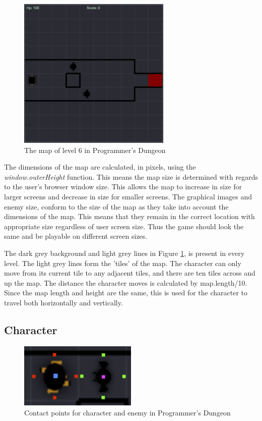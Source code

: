 \documentclass[a4paper,11.5pt]{report}
\numberwithin{figure}{section}
\numberwithin{table}{section}
\numberwithin{equation}{section}
\numberwithin{equation}{section}
\begin{document}
\begin{figure}[H]
 \centering
    \includegraphics[width=0.65\textwidth]{levelsix}
       \captionsetup{justification=centering}
\caption{The map of level 6 in Programmer's Dungeon}
\label{fig:levelsix}
\end{figure}


The dimensions of the map are calculated, in pixels, using the \textit{window.outerHeight} function. This means the map size is determined with regards to the user's browser window size. This allows the map to increase in size for larger screens and decrease in size for smaller screens. The graphical images and enemy size, conform to the size of the map as they take into account the dimensions of the map. This means that they remain in the correct location with appropriate size regardless of user screen size. Thus the game should look the same and be playable on different screen sizes.

The dark grey background and light grey lines in Figure \ref{fig:levelsix}, is present in every level. The light grey lines form the 'tiles' of the map. The character can only move from its current tile to any adjacent tiles, and there are ten tiles across and up the map. The distance the character moves is calculated by map.length/10. Since the map length and height are the same, this is used for the character to travel both horizontally and vertically.

\subsection{Character}

\begin{figure}
    \includegraphics[width=0.5\textwidth,]{charactercontact}
       \captionsetup{justification=centering}
\caption{Contact points for character and enemy in Programmer's Dungeon}
\label{fig:charactercontact}
\end{figure}
\end{document}
